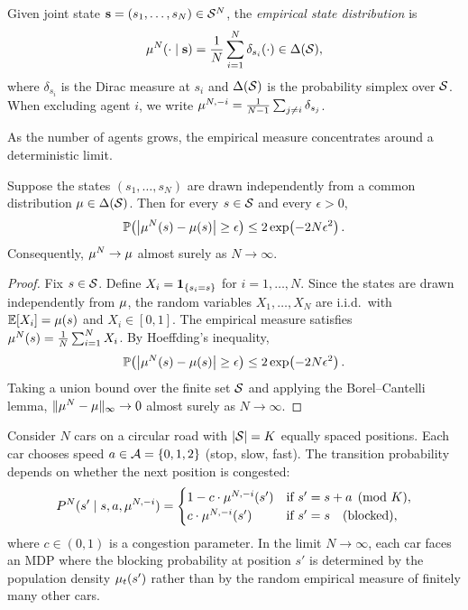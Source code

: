 \documentclass[11pt,a4paper]{article}
\begin{document}
\begin{definition}
\label{def:empirical-measure}
Given joint state $\mathbf{s} = (s_1, \ldots, s_N) \in \mathcal{S}^N$,
the \emph{empirical state distribution} is
\[
  \mu^N(\cdot \mid \mathbf{s})
  = \frac{1}{N}\sum_{i=1}^N \delta_{s_i}(\cdot)
  \in \Delta(\mathcal{S}),
\]
where $\delta_{s_i}$ is the Dirac measure at $s_i$ and
$\Delta(\mathcal{S})$ is the probability simplex over $\mathcal{S}$.
When excluding agent $i$, we write
$\mu^{N,-i} = \frac{1}{N-1}\sum_{j \neq i} \delta_{s_j}$.
\end{definition}

As the number of agents grows, the empirical measure concentrates
around a deterministic limit.

\begin{proposition}
\label{prop:empirical-concentration}
Suppose the states $(s_1, \ldots, s_N)$ are drawn independently
from a common distribution $\mu \in \Delta(\mathcal{S})$.
Then for every $s \in \mathcal{S}$ and every $\epsilon > 0$,
\[
  \mathbb{P}\!\left(\left|\mu^N(s) - \mu(s)\right|
  \geq \epsilon\right) \leq 2\exp\!\left(-2N\epsilon^2\right).
\]
Consequently, $\mu^N \to \mu$ almost surely as
$N \to \infty$.
\end{proposition}

\begin{proof}
Fix $s \in \mathcal{S}$.  Define $X_i = \mathbf{1}_{\{s_i = s\}}$ for
$i = 1, \ldots, N$.  Since the states are drawn independently from
$\mu$, the random variables $X_1, \ldots, X_N$ are i.i.d.\
with $\mathbb{E}[X_i] = \mu(s)$ and $X_i \in [0,1]$.  The empirical
measure satisfies $\mu^N(s) = \frac{1}{N}\sum_{i=1}^N X_i$.
By Hoeffding's inequality,
\[
  \mathbb{P}\!\left(\left|\mu^N(s) - \mu(s)\right|
  \geq \epsilon\right)
  \leq 2\exp\!\left(-2N\epsilon^2\right).
\]
Taking a union bound over the finite set $\mathcal{S}$ and applying
the Borel--Cantelli lemma, $\|\mu^N - \mu\|_\infty
\to 0$ almost surely as $N \to \infty$.
\end{proof}

\begin{example}
\label{ex:ring-road}
Consider $N$ cars on a circular road with $|\mathcal{S}| = K$ equally
spaced positions.  Each car chooses speed $a \in \mathcal{A}
= \{0, 1, 2\}$ (stop, slow, fast).  The transition probability
depends on whether the next position is congested:
\[
  P^N(s' \mid s, a, \mu^{N,-i})
  = \begin{cases}
    1 - c \cdot \mu^{N,-i}(s') & \text{if } s' = s + a
      \pmod{K}, \\
    c \cdot \mu^{N,-i}(s') & \text{if } s' = s
      \quad (\text{blocked}),
  \end{cases}
\]
where $c \in (0,1)$ is a congestion parameter.  In the limit
$N \to \infty$, each car faces an MDP where the blocking
probability at position $s'$ is determined by the
population density $\mu_t(s')$ rather than by the random
empirical measure of finitely many other cars.
\end{example}
\end{document}
